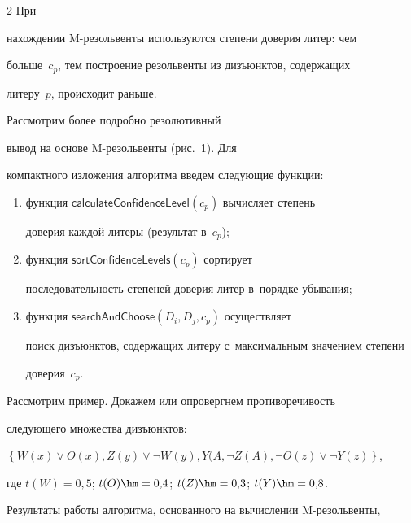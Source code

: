 \begin{multicols}{2}
При 


нахождении \mbox{M-ре}\-золь\-вен\-ты используются степени доверия литер: чем 


больше~$c_p$, тем построение резольвенты из дизъюнктов, содержащих 


литеру~$p$, происходит раньше. 





Рассмотрим более подробно резолютивный 


вывод на основе \mbox{M-ре}\-золь\-вен\-ты (рис.~1).  Для 


компактного изложения алгоритма введем следующие функции:


  \begin{enumerate}[(1)]


\item функция $\mathsf{calculateConfidenceLevel} (c_p)$ вычисляет степень 


доверия каждой литеры (результат в~$c_p$);


\item функция $\mathsf{sortConfidenceLevels} (c_p)$ сортирует 


последовательность степеней доверия литер в~порядке убывания;


\item функция $\mathsf{searchAndChoose} (D_i, D_j, c_p)$ осуществляет 


поиск дизъюнктов, содержащих литеру с~максимальным значением степени 


доверия~$c_p$. 


\end{enumerate}








  


  Рассмотрим пример. Докажем или опровергнем противоречивость 


следующего множества дизъюнктов:


$  \left\{


  W(x)\vee O(x), Z(y)\vee 


   \neg W(y), Y(A,\right.$\linebreak $\left. \neg Z(A), \neg O(z)\vee \neg 


Y(z)\right\}$,


где $t(W)=0{,}5$; $t(O)\hm= 0{,}4$; $t(Z)\hm= 0{,}3$; $t(Y)\hm= 0{,}8$. 


Результаты работы алгоритма, основанного на вычислении M-ре\-золь\-вен\-ты, 



\end{multicols}
